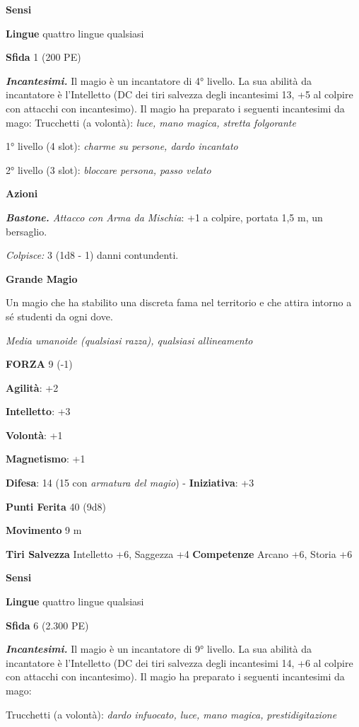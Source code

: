 \begin{multicols}{2}
\textbf{Sensi} 

\textbf{Lingue} quattro lingue qualsiasi

\textbf{Sfida} 1 (200 PE)

\emph{\textbf{Incantesimi.}} Il magio è un incantatore di 4° livello. La
sua abilità da incantatore è l'Intelletto (DC dei tiri salvezza degli
incantesimi 13, +5 al colpire con attacchi con incantesimo). Il magio ha
preparato i seguenti incantesimi da mago: Trucchetti (a volontà):
\emph{luce, mano magica, stretta folgorante}

1° livello (4 slot): \emph{charme su persone, dardo incantato}

2° livello (3 slot): \emph{bloccare persona, passo velato}

\textbf{Azioni}

\emph{\textbf{Bastone.} Attacco con Arma da Mischia}: +1 a colpire,
portata 1,5 m, un bersaglio.

\emph{Colpisce:} 3 (1d8 - 1) danni contundenti.

\textbf{Grande Magio}

Un magio che ha stabilito una discreta fama nel territorio e che attira
intorno a sé studenti da ogni dove.

\emph{Media umanoide (qualsiasi razza), qualsiasi allineamento}

\textbf{FORZA} 9 (-1)

\textbf{Agilità}: +2

\textbf{Intelletto}: +3

\textbf{Volontà}: +1

\textbf{Magnetismo}: +1

\textbf{Difesa}: 14 (15 con \emph{armatura del magio}) - \textbf{Iniziativa}: +3

\textbf{Punti Ferita} 40 (9d8)

\textbf{Movimento} 9 m

\textbf{Tiri Salvezza} Intelletto +6, Saggezza +4 \textbf{Competenze}
Arcano +6, Storia +6

\textbf{Sensi} 

\textbf{Lingue} quattro lingue qualsiasi

\textbf{Sfida} 6 (2.300 PE)

\emph{\textbf{Incantesimi.}} Il magio è un incantatore di 9° livello. La
sua abilità da incantatore è l'Intelletto (DC dei tiri salvezza degli
incantesimi 14, +6 al colpire con attacchi con incantesimo). Il magio ha
preparato i seguenti incantesimi da mago:

Trucchetti (a volontà): \emph{dardo infuocato, luce, mano magica,}
\emph{prestidigitazione}


\end{multicols}
